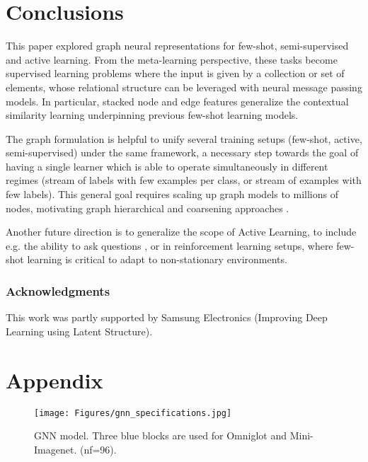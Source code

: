 \documentclass{article} \usepackage{iclr2018_conference,times}
\begin{document}
\section{Conclusions}


This paper explored graph neural representations for 
few-shot, semi-supervised and active learning. 
From the meta-learning perspective, these tasks become 
supervised learning problems where the input is given by 
a collection or set of elements, whose relational structure 
can be leveraged with neural message passing models. In particular,
stacked node and edge features generalize 
the contextual similarity learning underpinning previous 
few-shot learning models. 

The graph formulation is helpful to unify several training 
setups (few-shot, active, semi-supervised) under the same 
framework, a necessary step towards the goal of having a 
single learner which is able to operate simultaneously in 
different regimes (stream of labels with few examples per class, 
or stream of examples with few labels). This general 
goal requires scaling up graph models to millions of nodes, 
motivating graph hierarchical and coarsening approaches \cite{defferrard2016convolutional}.

Another future direction is to generalize the scope of 
 Active Learning, to include e.g. the ability to ask questions \cite{brenden17}, 
or in reinforcement learning setups, where few-shot learning is critical to 
adapt to non-stationary environments. 

 

\subsubsection*{Acknowledgments}
This work was partly supported by Samsung Electronics (Improving Deep Learning using Latent Structure).





\newpage
\section*{Appendix}

\begin{figure}[h]
    
    \centering
    \texttt{[image: Figures/gnn\_specifications.jpg]}

    \caption{GNN model. Three blue blocks are used for Omniglot and Mini-Imagenet. (nf=96).}
    \label{fig:GNN_model}
\end{figure} 
\end{document}
